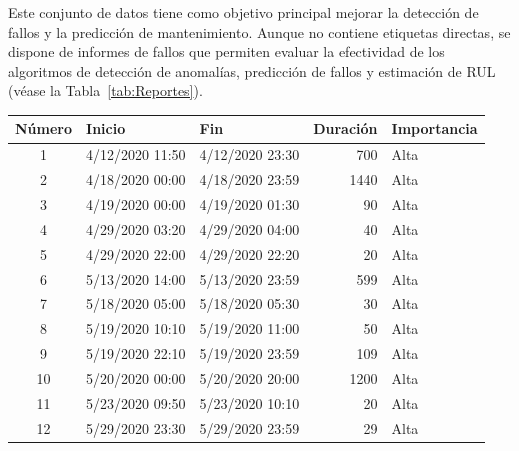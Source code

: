 \documentclass[12pt,letterpaper]{article}
\begin{document}
Este conjunto de datos tiene como objetivo principal mejorar la detección de fallos y la predicción de mantenimiento. 
Aunque no contiene etiquetas directas, se dispone de informes de fallos que permiten evaluar la efectividad de los algoritmos de detección de anomalías, predicción de fallos y estimación de RUL (véase la Tabla~\ref{tab:Reportes}).

\begin{table}[!ht]
    \centering
\begin{tabular}{|c|l|l|r|l|}
\hline
\textbf{Número} & \textbf{Inicio}       & \textbf{Fin}         & \textbf{Duración} & \textbf{Importancia} \\ \hline
1            & 4/12/2020 11:50          & 4/12/2020 23:30           & 700                & Alta              \\ \hline
2            & 4/18/2020 00:00          & 4/18/2020 23:59           & 1440               & Alta              \\ \hline
3            & 4/19/2020 00:00          & 4/19/2020 01:30           & 90                 & Alta              \\ \hline
4            & 4/29/2020 03:20          & 4/29/2020 04:00           & 40                 & Alta              \\ \hline
5            & 4/29/2020 22:00          & 4/29/2020 22:20           & 20                 & Alta              \\ \hline
6            & 5/13/2020 14:00          & 5/13/2020 23:59           & 599                & Alta              \\ \hline
7            & 5/18/2020 05:00          & 5/18/2020 05:30           & 30                 & Alta              \\ \hline
8            & 5/19/2020 10:10          & 5/19/2020 11:00           & 50                 & Alta              \\ \hline
9            & 5/19/2020 22:10          & 5/19/2020 23:59           & 109                & Alta              \\ \hline
10           & 5/20/2020 00:00          & 5/20/2020 20:00           & 1200               & Alta              \\ \hline
11           & 5/23/2020 09:50          & 5/23/2020 10:10           & 20                 & Alta              \\ \hline
12           & 5/29/2020 23:30          & 5/29/2020 23:59           & 29                 & Alta              \\ \hline

\end{tabular}
\end{table}
\end{document}
